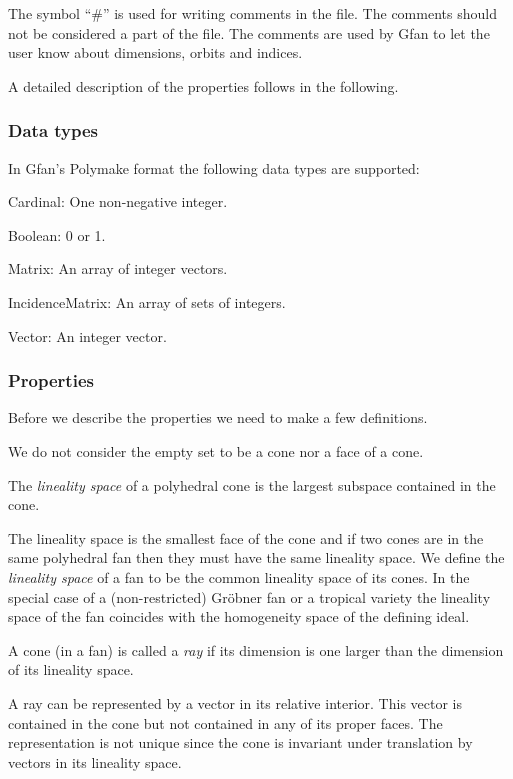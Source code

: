 The symbol ``\#'' is used for writing comments in the file. The comments should not be considered a part of the file. The comments are used by Gfan to let the user know about dimensions, orbits and indices.

A detailed description of the properties follows in the following.
\subsubsection{Data types}
In Gfan's Polymake format the following data types are supported:
\begin{description}
\item{Cardinal:} One non-negative integer.
\item{Boolean:} 0 or 1.
\item{Matrix:} An array of integer vectors.
\item{IncidenceMatrix:} An array of sets of integers.
\item{Vector:} An integer vector.
\end{description}
\subsubsection{Properties}
Before we describe the properties we need to make a few definitions.

We do not consider the empty set to be a cone nor a face of a cone.
\begin{definition}
The \emph{lineality space} of a polyhedral cone is the largest subspace contained in the cone.
\end{definition}
The lineality space is the smallest face of the cone and if two cones
are in the same polyhedral fan then they must have the same lineality
space. We define the \emph{lineality space} of a fan to be the common
lineality space of its cones. In the special case of a
(non-restricted) Gr\"obner fan or a tropical variety the lineality
space of the fan coincides with the homogeneity space of the defining ideal.

\begin{definition}
A cone (in a fan) is called a \emph{ray} if its dimension is one larger than the dimension of its lineality space.
\end{definition}
A ray can be represented by a vector in its relative interior. This
vector is contained in the cone but not contained in any of its
proper faces. The representation is not unique since the cone is
invariant under translation by vectors in its lineality space.

